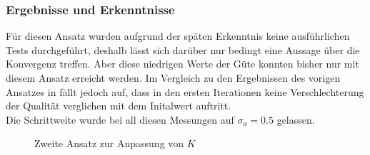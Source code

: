 \documentclass[../Report.tex]{subfiles}
\begin{document}
\subsubsection*{Ergebnisse und Erkenntnisse}
\label{subsubsec:opt.adjusta.kleiner.results}
Für diesen Ansatz wurden aufgrund der späten Erkenntnis keine ausführlichen Tests durchgeführt, deshalb lässt sich darüber nur bedingt eine Aussage über die Konvergenz treffen. Aber diese niedrigen Werte der Güte konnten bisher nur mit diesem Ansatz erreicht werden. Im Vergleich zu den Ergebnissen des vorigen Ansatzes in  fällt jedoch auf, dass in den ersten Iterationen keine Verschlechterung der Qualität verglichen mit dem Initalwert auftritt.
\\
Die Schrittweite wurde bei all diesen Messungen auf $\sigma_a = 0.5$ gelassen.
\begin{figure}[H]
\begin{subfigure}{0.5 \textwidth}
	\setlength\figureheight{7.5cm}
	\setlength\figurewidth{7.5cm}
    
	\label{fig:opt.kleinerBereich.K}
\end{subfigure}
\begin{subfigure}{0.5 \textwidth}
	\setlength\figureheight{7.5cm}
	\setlength\figurewidth{7.5cm}
    
	\label{fig:opt.kleinerBereich.Q}
\end{subfigure}
\label{fig:opt.Kennlinie}
\caption{Zweite Ansatz zur Anpassung von $K$}
\end{figure}
\end{document}
